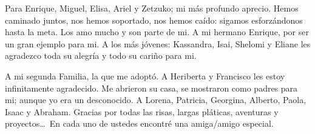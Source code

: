 Para Enrique, Miguel, Elisa, Ariel y Zetzuko; mi más profundo aprecio. Hemos caminado juntos, nos hemos soportado, nos hemos caído: sigamos esforzándonos hasta la meta. Los amo mucho y son parte de mi. A mi hermano Enrique, por ser un gran ejemplo para mi. A los más jóvenes: Kassandra, Isai, Shelomi y Eliane les agradezco toda su alegría y todo su cariño para mi.

A mi segunda Familia, la que me adoptó. A Heriberta y Francisco les estoy infinitamente agradecido. Me abrieron su casa, se mostraron como padres para mi; aunque yo era un desconocido. A Lorena, Patricia, Georgina, Alberto, Paola, Isaac y Abraham. Gracias por todas las risas, largas pláticas, aventuras y proyectos\ldots\, En cada uno de ustedes encontré una amiga/amigo especial.

\vspace*{\fill}

